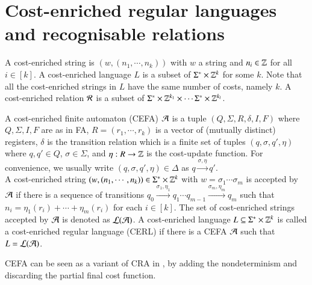\documentclass{llncs}
\begin{document}


\section{Cost-enriched regular languages and recognisable relations}


A cost-enriched string is $(w, (n_1, \cdots, n_k))$ with $w$  a string and $n_i \in \mathbb{Z}$ for all $i \in [k]$. 
A cost-enriched language $L$ is a subset of $\Sigma^* \times \mathbb{Z}^k$ for some $k$. Note that all the cost-enriched strings in $L$ have the same number of costs, namely $k$.
A cost-enriched relation $\mathcal{R}$ is a subset of $\Sigma^* \times \mathbb{Z}^{k_1} \times \cdots \Sigma^* \times \mathbb{Z}^{k_l}$.

\begin{definition}
A cost-enriched finite automaton (CEFA) $\mathcal{A}$ is a tuple $(Q, \Sigma, R, \delta, I, F)$ where $Q, \Sigma, I, F$ are as in FA, $R=(r_1, \cdots, r_k)$ is a vector of (mutually distinct) registers, $\delta$ is the transition relation which is a finite set of tuples $(q, \sigma, q', \eta)$ where $q, q' \in Q$, $\sigma \in \Sigma$, and $\eta: R \rightarrow \mathbb{Z}$ is the cost-update function. For convenience, we usually write $(q, \sigma, q', \eta) \in \Delta$ as $q \xrightarrow{\sigma, \eta} q'$.
\\
A cost-enriched string $(w, (n_1, \cdots,n_k)) \in \Sigma^* \times \mathbb{Z}^k$ with $w=\sigma_1 \cdots \sigma_m$ is accepted by $\mathcal{A}$ if there is a sequence of transitions $q_0 \xrightarrow{\sigma_1, \eta_1} q_1 \cdots q_{m-1} \xrightarrow{\sigma_m, \eta_m} q_m$ such that $n_i = \eta_1(r_i) + \cdots + \eta_m(r_i)$ for each $i \in [k]$. The set of cost-enriched strings accepted by $\mathcal{A}$ is denoted as $\mathcal{L}(\mathcal{A})$. A cost-enriched language $L \subseteq \Sigma^* \times \mathbb{Z}^k$ is called a cost-enriched regular language (CERL) if there is a CEFA $\mathcal{A}$ such that $L = \mathcal{L}(\mathcal{A})$.
\end{definition}
CEFA can be seen as a variant of CRA in \cite{RLJ+13}, by adding the nondeterminism and discarding the partial final cost function. 
\end{document}

